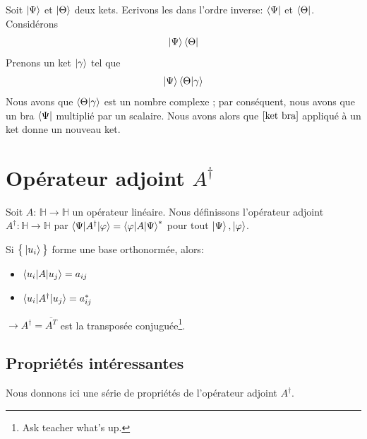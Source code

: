 \documentclass[../notesdecours.tex]{subfiles}
\begin{document}
\begin{exemple} 
Soit $\ket{\Psi}$ et $\ket{\Theta}$ deux kets. Ecrivons les dans l'ordre inverse: $\bra{\Psi}$ et $\bra{\Theta}$. Considérons 
\begin{equation}
\ket{\Psi}\bra{\Theta}
\label{ket bra}
\end{equation}
Prenons un ket $\ket{\gamma}$ tel que
\begin{equation}
\ket{\Psi}\braket{\Theta|\gamma}
\end{equation}
Nous avons que $\braket{\Theta|\gamma}$ est un nombre complexe ; par conséquent, nous avons que un bra $\bra{\Psi}$ multiplié par un scalaire. Nous avons alors que $\eqref{ket bra}$ appliqué à un ket donne un nouveau ket.
\end{exemple}

\section{Opérateur adjoint $A^\dag$}
\begin{definition} Soit $A$: $\mathbb{H} \rightarrow \mathbb{H}$ un opérateur linéaire. Nous définissons l'opérateur adjoint $A^\dag : \mathbb{H} \rightarrow \mathbb{H}$ par $\braket{\Psi|A^\dag|\varphi} = \braket{\varphi|A|\Psi}^*$ pour tout $\ket{\Psi},\ket{\varphi}$. \end{definition}

Si $\big\{\ket{u_i}\big\}$ forme une base orthonormée, alors:
\begin{itemize}
\item $\braket{u_i|A|u_j} = a_{ij}$
\item $\braket{u_i|A^\dag|u_j} = a^*_{ij}$
\end{itemize}
$\rightarrow A^\dag = \overline{A^T}$ est la transposée conjuguée\footnote{Ask teacher what's up.}.\\
\subsection{Propriétés intéressantes}
Nous donnons ici une série de propriétés de l'opérateur adjoint $A^\dag$.
\begin{center}
\end{center}
\end{document}
